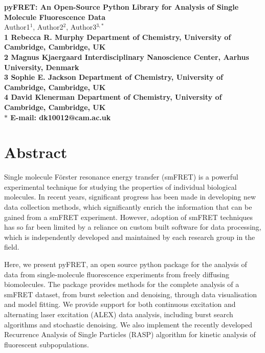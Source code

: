 \documentclass[10pt]{article}
\date{}
\begin{document}
\begin{flushleft}
{\Large
\textbf{pyFRET: An Open-Source Python Library for Analysis of Single Molecule Fluorescence Data}
}
\\
Author1$^{1}$, 
Author2$^{2}$, 
Author3$^{3,\ast}$
\\
\bf{1} Rebecca R. Murphy Department of Chemistry, University of Cambridge, Cambridge, UK
\\
\bf{2} Magnus Kjaergaard Interdisciplinary Nanoscience Center, Aarhus University, Denmark 
\\
\bf{3} Sophie E. Jackson Department of Chemistry, University of Cambridge, Cambridge, UK
\\
\bf{4} David Klenerman Department of Chemistry, University of Cambridge, Cambridge, UK
\\
$\ast$ E-mail: dk10012@cam.ac.uk
\end{flushleft}

\section*{Abstract}


Single molecule  F\"{o}rster resonance energy transfer (smFRET) is a powerful experimental technique for studying the properties of individual biological molecules. In recent years, significant progress has been made in developing new data collection methods, which significantly enrich the information that can be gained from a smFRET experiment. However, adoption of smFRET techniques has so far been limited by a reliance on custom built software for data processing, which is independently developed and maintained by each research group in the field. 

Here, we present pyFRET, an open source python package for the analysis of data from single-molecule fluorescence experiments from freely diffusing biomolecules. The package provides methods for the complete analysis of a smFRET dataset, from burst selection and denoising, through data visualisation and model fitting. We provide support for both continuous excitation and alternating laser excitation (ALEX) data analysis, including burst search algorithms and stochastic denoising. We also implement the recently developed Recurrence Analysis of Single Particles (RASP) algorithm for kinetic analysis of fluorescent subpopulations.
\end{document}
